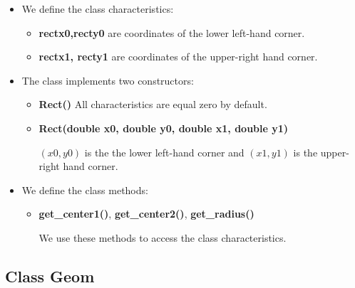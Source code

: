 \documentclass{report}
\begin{document}
	\begin{itemize}
		\item We define the class characteristics: 
		\begin{itemize}
			\item {\bfseries rectx0,recty0} are coordinates of the lower left-hand corner.
			
			\item {\bfseries rectx1, recty1} are coordinates of the upper-right hand corner.
		\end{itemize}
		
		\item The class implements two constructors:
		\begin{itemize}
			\item {\bfseries Rect()} All characteristics are equal zero by default. 
			
			\item {\bfseries Rect(double x0, double y0, double x1, double y1)}
			
			$(x0, y0)$ is the the lower left-hand corner and $(x1, y1)$ is the upper-right hand corner. 	
		\end{itemize}
		
		\item We define the class methods:
		
		\begin{itemize}
			\item {\bfseries get\_center1()}, {\bfseries get\_center2()}, {\bfseries get\_radius()}
			
			We use these  methods to access the class characteristics.
		\end{itemize}
	\end{itemize}

	\newpage
		
	\subsection*{Class Geom}
	\label{Geom}
	
\end{document}
